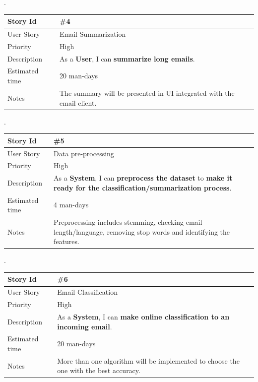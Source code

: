 .\\

\begin{tabular}{|p{3cm}|p{10cm}|}
\hline
\cellcolor[gray]{0.9} Story Id & \#4 \\ \hline
\cellcolor[gray]{0.9} User Story & Email Summarization\\ \hline
\cellcolor[gray]{0.9} Priority & High\\ \hline
\cellcolor[gray]{0.9} Description & 
	As a \textbf{User}, I can \textbf{summarize long emails}. \\ \hline
\cellcolor[gray]{0.9} Estimated time & 20 man-days\\ \hline
\cellcolor[gray]{0.9} Notes & 
	The summary will be presented in UI integrated with the email client. \\ \hline
\end{tabular}


.\\

\begin{tabular}{|p{3cm}|p{10cm}|}
\hline
\cellcolor[gray]{0.9} Story Id & \#5 \\ \hline
\cellcolor[gray]{0.9} User Story & Data pre-processing \\ \hline
\cellcolor[gray]{0.9} Priority & High\\ \hline
\cellcolor[gray]{0.9} Description & 
	As a \textbf{System}, I can \textbf{preprocess the dataset} to
	\textbf{make it ready for the classification/summarization process}. \\ \hline
\cellcolor[gray]{0.9} Estimated time & 4 man-days\\ \hline
\cellcolor[gray]{0.9} Notes & 
	Preprocessing includes stemming, checking email length/language,
	removing stop words and identifying the features. \\ \hline
\end{tabular}


.\\

\begin{tabular}{|p{3cm}|p{10cm}|}
\hline
\cellcolor[gray]{0.9} Story Id & \#6 \\ \hline
\cellcolor[gray]{0.9} User Story & Email Classification \\ \hline
\cellcolor[gray]{0.9} Priority & High\\ \hline
\cellcolor[gray]{0.9} Description & 
	As a \textbf{System}, I can \textbf{make online classification to
	an incoming email}. \\ \hline
\cellcolor[gray]{0.9} Estimated time & 20 man-days\\ \hline
\cellcolor[gray]{0.9} Notes & 
	More than one algorithm will be implemented to choose the one with 
	the best accuracy. \\ \hline
\end{tabular}


